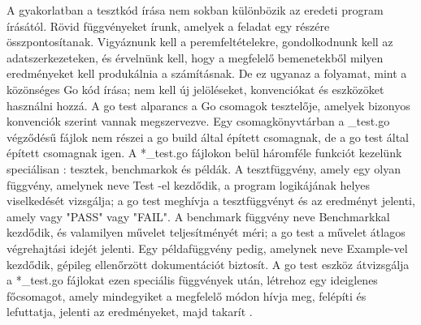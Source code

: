 A gyakorlatban a tesztkód írása nem sokban különbözik az eredeti program írásától. Rövid függvényeket írunk, amelyek a feladat egy részére összpontosítanak.
Vigyáznunk kell a peremfeltételekre, gondolkodnunk kell az adatszerkezeteken, és érvelnünk kell, hogy a megfelelő bemenetekből milyen eredményeket kell produkálnia a számításnak. De ez ugyanaz a folyamat, mint a közönséges Go kód írása; nem kell új jelöléseket, konvenciókat és eszközöket használni hozzá.
A go test alparancs a Go csomagok tesztelője, amelyek bizonyos konvenciók szerint vannak megszervezve. Egy csomagkönyvtárban a \_test.go végződésű fájlok nem részei a go build által épített csomagnak, de a go test által épített csomagnak igen.
A *\_test.go fájlokon belül háromféle funkciót kezelünk speciálisan : tesztek, benchmarkok és példák.
A tesztfüggvény, amely egy olyan függvény, amelynek neve Test -el kezdődik, a program logikájának helyes viselkedését vizsgálja; a go test meghívja a tesztfüggvényt és az eredményt jelenti, amely vagy "PASS" vagy "FAIL".
A benchmark függvény neve Benchmarkkal kezdődik, és valamilyen művelet teljesítményét méri; a go test a művelet átlagos végrehajtási idejét jelenti. Egy példafüggvény pedig, amelynek neve Example-vel kezdődik, gépileg ellenőrzött dokumentációt biztosít.
A go test eszköz átvizsgálja a *\_test.go fájlokat ezen speciális függvények után, létrehoz egy ideiglenes főcsomagot, amely mindegyiket a megfelelő módon hívja meg, felépíti és lefuttatja, jelenti az eredményeket, majd takarít \cite{Alan15}.